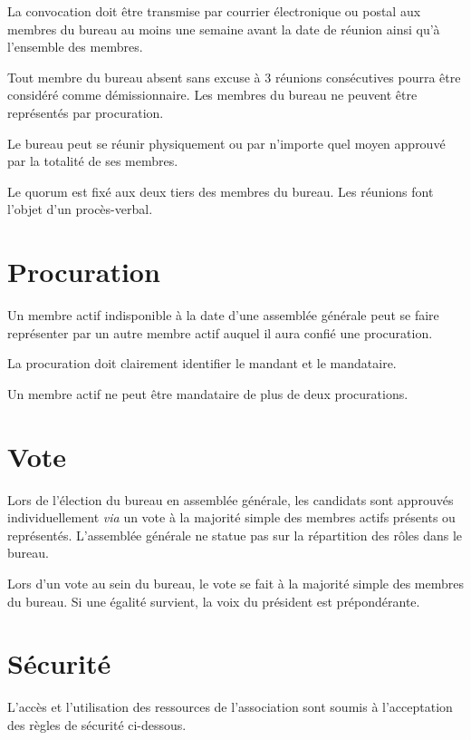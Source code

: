 \documentclass[a4paper, 11pt]{article}
\begin{document}
La convocation doit être transmise par courrier électronique ou postal aux membres du bureau au moins une semaine avant
la date de réunion ainsi qu'à l'ensemble des membres.

Tout membre du bureau absent sans excuse à 3 réunions consécutives pourra être considéré comme démissionnaire.
Les membres du bureau ne peuvent être représentés par procuration.

Le bureau peut se réunir physiquement ou par n'importe quel moyen approuvé par la totalité de ses membres.

Le quorum est fixé aux deux tiers des membres du bureau.
Les réunions font l'objet d'un procès-verbal.


\section{Procuration} %

Un membre actif indisponible à la date d'une assemblée générale peut se faire représenter par un autre membre actif
auquel il aura confié une procuration.

La procuration doit clairement identifier le mandant et le mandataire.

Un membre actif ne peut être mandataire de plus de deux procurations.


\section{Vote} %

Lors de l'élection du bureau en assemblée générale, les candidats sont approuvés individuellement \textit{via} un vote à
la majorité simple des membres actifs présents ou représentés.
L'assemblée générale ne statue pas sur la répartition des rôles dans le bureau.

Lors d'un vote au sein du bureau, le vote se fait à la majorité simple des membres du bureau.
Si une égalité survient, la voix du président est prépondérante.


\section{Sécurité} %

L'accès et l'utilisation des ressources de l'association sont soumis à l'acceptation des règles de sécurité ci-dessous.
\end{document}
